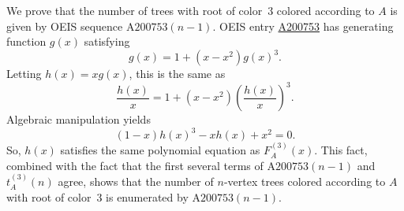 \documentclass[12pt]{amsart}
\newcommand{\seqnum}[1]{\href{https://oeis.org/#1}{#1}}
\newcommand{\gff}[2]{F_{#2}^{(#1)}(x)}
\newcommand{\gfa}[1]{\gff{#1}{A}}
\begin{document}
\begin{description}
\begin{itemize}
\end{itemize}
    \item[Discussion] We prove that the number of trees with root of color~3 colored according to $A$ is given by OEIS sequence $\text{A200753}(n-1)$.
    OEIS entry \seqnum{A200753} has generating function $g(x)$ satisfying
    \[
    g(x) = 1 + (x - x^2)g(x)^3.
    \]
    Letting $h(x)=xg(x)$, this is the same as
    \[
    \frac{h(x)}{x} = 1 + (x - x^2)\left(\frac{h(x)}{x}\right)^3.
    \]
    Algebraic manipulation yields
    \[
    (1 - x)h(x)^3-xh(x)+x^2=0.
    \]
    So, $h(x)$ satisfies the same polynomial equation as $\gfa{3}$. This fact, combined with the fact that the first several terms of $\text{A200753}(n-1)$ and $t_A^{(3)}(n)$ agree, shows that the number of $n$-vertex trees colored according to $A$ with root of color~3 is enumerated by $\text{A200753}(n-1)$.
\end{description}
\end{document}
